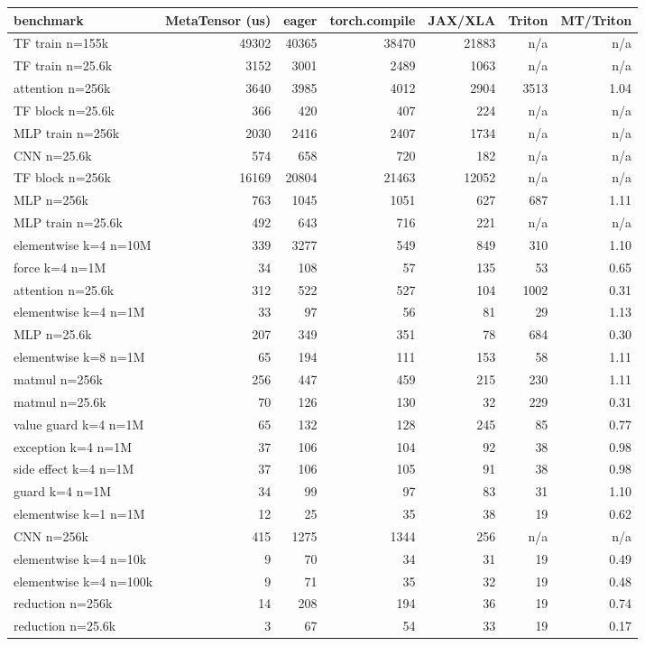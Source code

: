 \begin{tabular}{lrrrrrr}
\toprule
benchmark & MetaTensor (us) & eager & torch.compile & JAX/XLA & Triton & MT/Triton \\
\midrule
TF train n=155k & 49302 & 40365 & 38470 & 21883 & n/a & n/a \\
TF train n=25.6k & 3152 & 3001 & 2489 & 1063 & n/a & n/a \\
attention n=256k & 3640 & 3985 & 4012 & 2904 & 3513 & 1.04 \\
TF block n=25.6k & 366 & 420 & 407 & 224 & n/a & n/a \\
MLP train n=256k & 2030 & 2416 & 2407 & 1734 & n/a & n/a \\
CNN n=25.6k & 574 & 658 & 720 & 182 & n/a & n/a \\
TF block n=256k & 16169 & 20804 & 21463 & 12052 & n/a & n/a \\
MLP n=256k & 763 & 1045 & 1051 & 627 & 687 & 1.11 \\
MLP train n=25.6k & 492 & 643 & 716 & 221 & n/a & n/a \\
elementwise k=4 n=10M & 339 & 3277 & 549 & 849 & 310 & 1.10 \\
force k=4 n=1M & 34 & 108 & 57 & 135 & 53 & 0.65 \\
attention n=25.6k & 312 & 522 & 527 & 104 & 1002 & 0.31 \\
elementwise k=4 n=1M & 33 & 97 & 56 & 81 & 29 & 1.13 \\
MLP n=25.6k & 207 & 349 & 351 & 78 & 684 & 0.30 \\
elementwise k=8 n=1M & 65 & 194 & 111 & 153 & 58 & 1.11 \\
matmul n=256k & 256 & 447 & 459 & 215 & 230 & 1.11 \\
matmul n=25.6k & 70 & 126 & 130 & 32 & 229 & 0.31 \\
value guard k=4 n=1M & 65 & 132 & 128 & 245 & 85 & 0.77 \\
exception k=4 n=1M & 37 & 106 & 104 & 92 & 38 & 0.98 \\
side effect k=4 n=1M & 37 & 106 & 105 & 91 & 38 & 0.98 \\
guard k=4 n=1M & 34 & 99 & 97 & 83 & 31 & 1.10 \\
elementwise k=1 n=1M & 12 & 25 & 35 & 38 & 19 & 0.62 \\
CNN n=256k & 415 & 1275 & 1344 & 256 & n/a & n/a \\
elementwise k=4 n=10k & 9 & 70 & 34 & 31 & 19 & 0.49 \\
elementwise k=4 n=100k & 9 & 71 & 35 & 32 & 19 & 0.48 \\
reduction n=256k & 14 & 208 & 194 & 36 & 19 & 0.74 \\
reduction n=25.6k & 3 & 67 & 54 & 33 & 19 & 0.17 \\
\bottomrule
\end{tabular}
